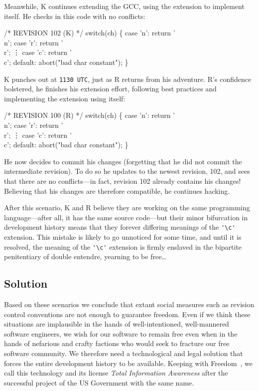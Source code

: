 \documentclass[twocolumn]{article}
\begin{document}
Meanwhile, K continues extending the GCC, using the extension to
implement itself. He checks in this code with no conflicts:
%
\begin{code}
/* REVISION 102 (K) */
switch(ch) \{
  case 'n': return '\\n';
  case 'r': return '\\r';
  \vdots
  case 'c': return '\\c';
  default: abort("bad char constant");
\}
\end{code}
%
K punches out at {\tt 1130 UTC},\z{}
just as R returns from his adventure. R's confidence bolstered, he
finishes his extension effort, following best practices and
implementing the extension using itself:
%
\begin{code}
/* REVISION 100 (R) */
switch(ch) \{
  case 'n': return '\\n';
  case 'r': return '\\r';
  \vdots
  case 'c': return '\\c';
  default: abort("bad char constant");
\}
\end{code}
%
He now decides to commit his changes (forgetting that he did not
commit the intermediate revision). To do so he updates to the newest
revision, 102, and sees that there are no conflicts---in fact,
revision 102 already contains his changes! Believing that his changes
are therefore compatible, he continues hacking.

After this scenario, K and R believe they are working on the same
programming language---after all, it has the same source code---but
their minor bifurcation in development history means that they forever
differing meanings of the \verb+'\c'+ extension. This mistake is
likely to go unnoticed for some time, and until it is resolved, the
meaning of the \verb+'\c'+ extension is firmly enslaved in the
bipartite penitentiary of double entendre, yearning to be
free\ldots\z{}

\subsection{Solution}

Based on these scenarios we conclude that extant social measures such
as revision control conventions are not enough to guarantee freedom.
Even if we think these situations are implausible in the hands of
well-intentioned, well-mannered software engineers, we wish for our
software to remain free even when in the hands of nefarious and crafty
factions who would seek to fracture
our free software community. We therefore need a technological and
legal solution that forces the entire development history to be
available. Keeping with Freedom~\fusa, we call this technology and its
license {\em Total Information Awareness} after the successful project
of the US Government with the same name.\z{}
\end{document}

